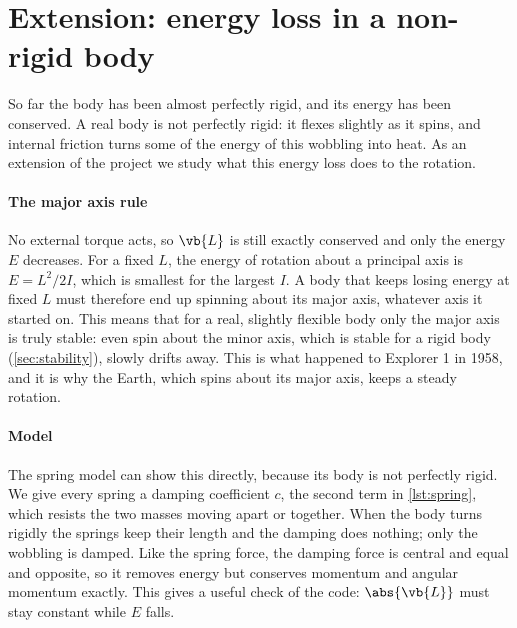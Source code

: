 \section{Extension: energy loss in a non-rigid body}
\label{sec:extension}
So far the body has been almost perfectly rigid, and its energy has been conserved.
A real body is not perfectly rigid: it flexes slightly as it spins, and internal friction turns some of the energy of this wobbling into heat.
As an extension of the project we study what this energy loss does to the rotation.

\paragraph{The major axis rule}
No external torque acts, so $\vb{L}$ is still exactly conserved and only the energy $E$ decreases.
For a fixed $L$, the energy of rotation about a principal axis is $E=L^2/2I$, which is smallest for the largest $I$.
A body that keeps losing energy at fixed $L$ must therefore end up spinning about its major axis, whatever axis it started on.
This means that for a real, slightly flexible body only the major axis is truly stable: even spin about the minor axis, which is stable for a rigid body (\cref{sec:stability}), slowly drifts away.
This is what happened to Explorer 1 in 1958, and it is why the Earth, which spins about its major axis, keeps a steady rotation.

\paragraph{Model}
The spring model can show this directly, because its body is not perfectly rigid.
We give every spring a damping coefficient $c$, the second term in \cref{lst:spring}, which resists the two masses moving apart or together.
When the body turns rigidly the springs keep their length and the damping does nothing; only the wobbling is damped.
Like the spring force, the damping force is central and equal and opposite, so it removes energy but conserves momentum and angular momentum exactly.
This gives a useful check of the code: $\abs{\vb{L}}$ must stay constant while $E$ falls.

